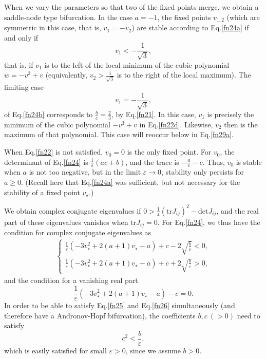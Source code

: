 When we vary the parameters so that two of the fixed points merge,
we obtain a saddle-node type bifurcation. In the case $a=-1$, the
fixed points $v_{1,2}$ (which are symmetric in this case, that is,
$v_1=-v_2$) are stable according to Eq.\eqref{fn24a} if and only if 
\begin{equation}\label{fn24b}
v_1 < -\frac{1}{\sqrt{3}}, \end{equation} that is, if $v_1$  is to the left
of the local minimum of the cubic polynomial $w=-v^3+v$
(equivalently, $v_2>\frac{1}{\sqrt{3}}$ is to the right of the
local maximum). The limiting case \begin{equation}\label{fn24c} v_1
=-\frac{1}{\sqrt{3}}, \end{equation} of Eq.\eqref{fn24b} corresponds to
$\frac{b}{c}=\frac{2}{3}$, by Eq.\eqref{fn21}.  In this case, $v_1$
is precisely the minimum of the cubic polynomial $-v^3 +v$ in
Eq.\eqref{fn22d}. Likewise, $v_2$ then is the maximum of that
polynomial. This case will reoccur below in Eq.\eqref{fn29a}.

When Eq.\eqref{fn22} is not satisfied,  $v_0=0$ is the only fixed
point. For $v_0$, the determinant of Eq.\eqref{fn24} is
$\frac{1}{\varepsilon}(ac+b)$, and the trace is
$-\frac{a}{\varepsilon}-c$. Thus, $v_0$ is stable when $a$ is not
too negative, but in the limit $\varepsilon \to 0$, stability only
persists for $a\ge 0$. (Recall here that Eq.\eqref{fn24a} was
sufficient, but not necessary for the stability of a fixed point
$v_\star$.)

We obtain complex conjugate eigenvalues if
$0>\frac{1}{4}(\mathrm{tr} J_{ij} )^2 -\mathrm{det} J_{ij}$, and the real part of these eigenvalues vanishes when
$\mathrm{tr} J_{ij}=0$. For Eq.\eqref{fn24}, we thus have
the condition for complex conjugate eigenvalues as
\begin{equation}\label{fn25}
\begin{split}
\left\{\begin{array}{lcl}
\frac{1}{\varepsilon}(-3v_\star^2 +2(a+1)v_\star  -a) +c
-2\sqrt{\frac{b}{\varepsilon}}<0,\\
\frac{1}{\varepsilon}(-3v_\star^2 +2(a+1)v_\star  -a) +c
+2\sqrt{\frac{b}{\varepsilon}}>0,
\end{array}\right.
\end{split}
\end{equation}
and the condition for a
vanishing real part \begin{equation}\label{fn26} \frac{1}{\varepsilon}(-3v_\star^2
+2(a+1)v_\star  -a)-c=0. \end{equation} In order to be able to satisfy
Eq.\eqref{fn25} and Eq.\eqref{fn26} simultaneously  (and therefore have a 
Andronov-Hopf bifurcation), the coefficients
$b,c\ (>0)$ need to satisfy \begin{equation}\label{fn27} c^2 <\frac{b}{\varepsilon},
\end{equation} which is easily satisfied for small $\varepsilon >0$, since we
assume $b>0$.

